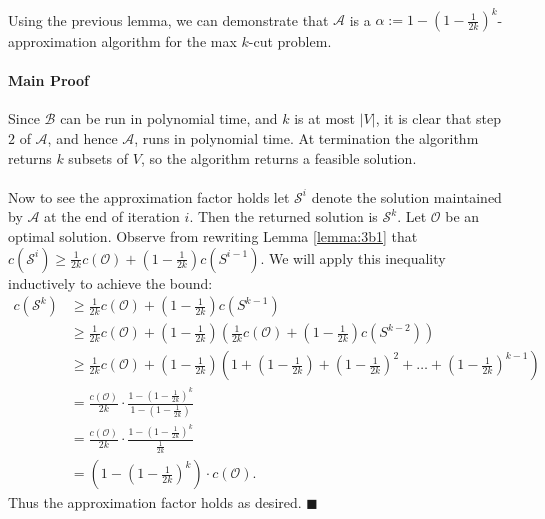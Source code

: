 \documentclass[letterpaper,12pt,oneside,onecolumn]{article}
\newcommand{\cA}{\mathcal{A}} \newcommand{\cB}{\mathcal{B}}
\newcommand{\cO}{\mathcal{O}} \newcommand{\cP}{\mathcal{P}}
\newcommand{\cS}{\mathcal{S}} \newcommand{\cT}{\mathcal{T}}
\begin{document}
\paragraph{}
Using the previous lemma, we can demonstrate that $\cA$ is a $\alpha := 1-(1-\frac{1}{2k})^k$-approximation algorithm for the max $k$-cut problem.
\paragraph{Main Proof}
Since $\cB$ can be run in polynomial time, and $k$ is at most $|V|$, it is clear that step $2$ of $\cA$, and hence $\cA$, runs in polynomial time. At termination the algorithm returns $k$ subsets of $V$, so the algorithm returns a feasible solution.
\paragraph{} 
Now to see the approximation factor holds let $\cS^i$ denote the solution maintained by $\cA$ at the end of iteration $i$. Then the returned solution is $\cS^{k}$. Let $\cO$ be an optimal solution. Observe from rewriting Lemma \ref{lemma:3b1} that $c(\cS^{i}) \geq \frac{1}{2k} c(\cO) + (1- \frac{1}{2k})c(S^{i-1})$. We will apply this inequality inductively to achieve the bound:
\begin{align*}
c(\cS^{k}) &\geq \frac{1}{2k} c(\cO) + (1- \frac{1}{2k})c(S^{k-1}) \\
		&\geq \frac{1}{2k} c(\cO) + (1- \frac{1}{2k})(\frac{1}{2k} c(\cO) + (1- \frac{1}{2k})c(S^{k-2})) \\
		&\geq \frac{1}{2k} c(\cO) + (1- \frac{1}{2k})(1 + (1-\frac{1}{2k}) + (1-\frac{1}{2k})^2 + \dots + (1-\frac{1}{2k})^{k-1}) \\
		&= \frac{c(\cO)}{2k} \cdot \frac{1-(1-\frac{1}{2k})^k}{1-(1-\frac{1}{2k})} \\
		&=\frac{c(\cO)}{2k} \cdot \frac{1-(1-\frac{1}{2k})^k}{\frac{1}{2k}}\\
		&= (1-(1-\frac{1}{2k})^k)\cdot c(\cO).
\end{align*}
Thus the approximation factor holds as desired. $\blacksquare$
\section{}
\end{document}
